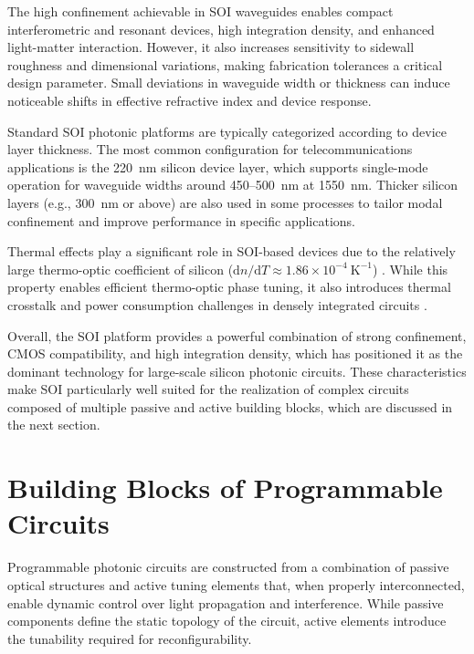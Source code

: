 The high confinement achievable in SOI waveguides enables compact interferometric and 
resonant devices, high integration density, and enhanced light-matter interaction. However, 
it also increases sensitivity to sidewall roughness and dimensional variations, making fabrication 
tolerances a critical design parameter. Small deviations in waveguide width or thickness can 
induce noticeable shifts in effective refractive index and device response.

Standard SOI photonic platforms are typically categorized according to device layer thickness. 
The most common configuration for telecommunications applications is the 220~nm silicon device 
layer, which supports single-mode operation for waveguide widths around 450–500~nm at 1550~nm. 
Thicker silicon layers (e.g., 300~nm or above) are also used in some processes to tailor modal 
confinement and improve performance in specific applications.

Thermal effects play a significant role in SOI-based devices due to the relatively large 
thermo-optic coefficient of silicon 
($\mathrm{d}n/\mathrm{d}T \approx 1.86 \times 10^{-4}~\mathrm{K}^{-1}$) 
\cite{cocorulloThermoopticalModulation15mm1992}. While this property enables efficient 
thermo-optic phase tuning, it also introduces thermal crosstalk and power consumption challenges 
in densely integrated circuits 
\cite{wattsAdiabaticThermoopticMach2013,coenenAnalysisThermalCrosstalk2022}.

Overall, the SOI platform provides a powerful combination of strong confinement, CMOS 
compatibility, and high integration density, which has positioned it as the dominant technology 
for large-scale silicon photonic circuits. These characteristics make SOI particularly well 
suited for the realization of complex circuits composed of multiple passive and active building 
blocks, which are discussed in the next section.



\section{Building Blocks of Programmable Circuits}

Programmable photonic circuits are constructed from a combination of passive optical structures 
and active tuning elements that, when properly interconnected, enable dynamic control over light 
propagation and interference. While passive components define the static topology of the circuit, 
active elements introduce the tunability required for reconfigurability.

